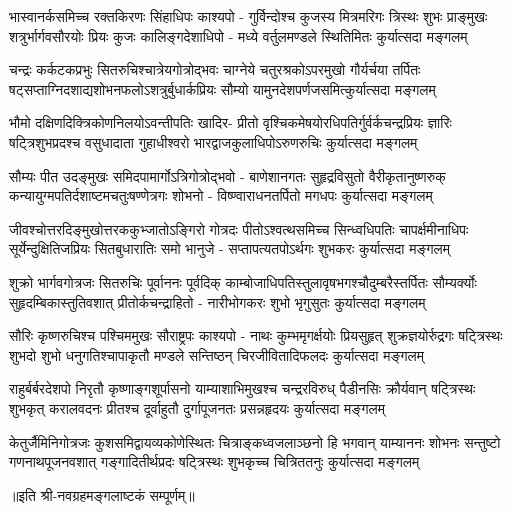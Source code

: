 
\fourlineindentedshloka
{भास्वानर्कसमिच्च रक्तकिरणः सिंहाधिपः काश्यपो -}
{गुर्विन्दोश्च कुजस्य मित्रमरिगः त्रिस्थः शुभः प्राङ्मुखः}
{शत्रुर्भार्गवसौरयोः प्रियः कुजः कालिङ्गदेशाधिपो -}
{मध्ये वर्तुलमण्डले स्थितिमितः कुर्यात्सदा मङ्गलम्}

\fourlineindentedshloka
{चन्द्रः कर्कटकप्रभुः सितरुचिश्चात्रेयगोत्रोद्भवः}
{चाग्नेये चतुरश्रकोऽपरमुखो गौर्यर्चया तर्पितः}
{षट्सप्ताग्निदशाद्यशोभनफलोऽशत्रुर्बुधार्कप्रियः}
{सौम्यो यामुनदेशपर्णजसमित्कुर्यात्सदा मङ्गलम्}

\fourlineindentedshloka
{भौमो दक्षिणदिक्त्रिकोणनिलयोऽवन्तीपतिः खादिर-}
{प्रीतो वृश्चिकमेषयोरधिपतिर्गुर्वर्कचन्द्रप्रियः}
{ज्ञारिः षट्त्रिशुभप्रदश्च वसुधादाता गुहाधीश्वरो}
{भारद्वाजकुलाधिपोऽरुणरुचिः कुर्यात्सदा मङ्गलम्}

\fourlineindentedshloka
{सौम्यः पीत उदङ्मुखः समिदपामार्गोऽत्रिगोत्रोद्भवो -}
{बाणेशानगतः सुहृद्रविसुतो वैरीकृतानुष्णरुक्}
{कन्यायुग्मपतिर्दशाष्टमचतुःषण्णेत्रगः शोभनो -}
{विष्ण्वाराधनतर्पितो मगधपः कुर्यात्सदा मङ्गलम्}

\fourlineindentedshloka
{जीवश्चोत्तरदिङ्मुखोत्तरककुभ्जातोऽङ्गिरो गोत्रदः}
{पीतोऽश्वत्थसमिच्च सिन्ध्वधिपतिः चापर्क्षमीनाधिपः}
{सूर्येन्दुक्षितिजप्रियः सितबुधारातिः समो भानुजे -}
{सप्तापत्यतपोऽर्थगः शुभकरः कुर्यात्सदा मङ्गलम्}

\fourlineindentedshloka
{शुक्रो भार्गवगोत्रजः सितरुचिः पूर्वाननः पूर्वदिक्}
{काम्बोजाधिपतिस्तुलावृषभगश्चौदुम्बरैस्तर्पितः}
{सौम्यर्क्योः सुहृदम्बिकास्तुतिवशात् प्रीतोर्कचन्द्राहितो -}
{नारीभोगकरः शुभो भृगुसुतः कुर्यात्सदा मङ्गलम्}

\fourlineindentedshloka
{सौरिः कृष्णरुचिश्च पश्चिममुखः सौराष्ट्रपः काश्यपो -}
{नाथः कुम्भमृगर्क्षयोः प्रियसुहृत् शुक्रज्ञयोर्रुद्रगः}
{षट्त्रिस्थः शुभदो शुभो  धनुगतिश्चापाकृतौ मण्डले}
{सन्तिष्ठन् चिरजीवितादिफलदः कुर्यात्सदा मङ्गलम्}

\fourlineindentedshloka
{राहुर्बर्बरदेशपो  निरृतौ कृष्णाङ्गशूर्पासनो}
{याम्याशाभिमुखश्च चन्द्ररविरुध् पैडीनसिः क्रौर्यवान्}
{षट्त्रिस्थः शुभकृत् करालवदनः प्रीतश्च दूर्वाहुतौ}
{दुर्गापूजनतः प्रसन्नहृदयः कुर्यात्सदा मङ्गलम्}

\fourlineindentedshloka
{केतुर्जैमिनिगोत्रजः कुशसमिद्वायव्यकोणेस्थितः}
{चित्राङ्कध्वजलाञ्छनो हि भगवान् याम्याननः शोभनः}
{सन्तुष्टो गणनाथपूजनवशात् गङ्गादितीर्थप्रदः}
{षट्त्रिस्थः शुभकृच्च चित्रिततनुः कुर्यात्सदा मङ्गलम्}

॥इति श्री-नवग्रहमङ्गलाष्टकं सम्पूर्णम्॥